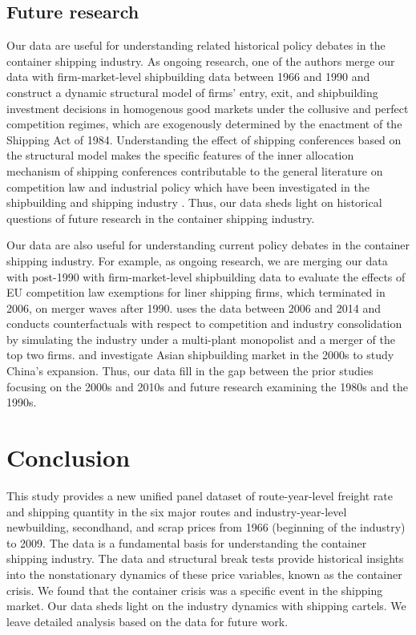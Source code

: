 \documentclass[11pt]{article}
\begin{document}
\subsection{Future research}

Our data are useful for understanding related historical policy debates in the container shipping industry. 
As ongoing research, one of the authors merge our data with firm-market-level shipbuilding data between 1966 and 1990 and construct a dynamic structural model of firms' entry, exit, and shipbuilding investment decisions in homogenous good markets under the collusive and perfect competition regimes, which are exogenously determined by the enactment of the Shipping Act of 1984. 
Understanding the effect of shipping conferences based on the structural model makes the specific features of the inner allocation mechanism of shipping conferences contributable to the general literature on competition law and industrial policy which have been investigated in the shipbuilding and shipping industry \citep{kalouptsidi2017res,barwick2019china}.
Thus, our data sheds light on historical questions of future research in the container shipping industry.

Our data are also useful for understanding current policy debates in the container shipping industry. 
For example, as ongoing research, we are merging our data with post-1990 with firm-market-level shipbuilding data to evaluate the effects of EU competition law exemptions for liner shipping firms, which terminated in 2006, on merger waves after 1990. 
\cite{jeon2022learning} uses the data between 2006 and 2014 and conducts counterfactuals with respect to competition and industry consolidation by simulating the industry under a multi-plant monopolist and a merger of the top two firms. \cite{kalouptsidi2017res} and \cite{barwick2019china} investigate Asian shipbuilding market in the 2000s to study China’s expansion. Thus, our data fill in the gap between the prior studies focusing on the 2000s and 2010s and future research examining the 1980s and the 1990s.




\section{Conclusion}\label{sec:conclusion}
This study provides a new unified panel dataset of route-year-level freight rate and shipping quantity in the six major routes and industry-year-level newbuilding, secondhand, and scrap prices from 1966 (beginning of the industry) to 2009. The data is a fundamental basis for understanding the container shipping industry. The data and structural break tests provide historical insights into the nonstationary dynamics of these price variables, known as the container crisis. We found that the container crisis was a specific event in the shipping market. Our data sheds light on the industry dynamics with shipping cartels. We leave detailed analysis based on the data for future work. 
\end{document}
